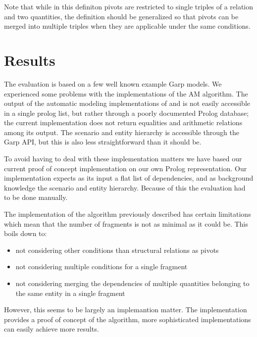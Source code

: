 \documentclass{article} %
\begin{document}
Note that while in this definiton pivots are restricted to single triples of a
relation and two quantities, the definition should be generalized so that
pivots can be merged into multiple triples when they are applicable under the
same conditions.

\section{Results}

The evaluation is based on a few well known example Garp models. 
We experienced some problems with the implementations of the AM algorithm.
The output of the automatic modeling implementations of \cite{buisman} and
\cite{vanweelden} is not easily accessible in a single prolog list, but rather
through a poorly documented Prolog database; the current implementation 
\cite{vanweelden} does not return equalities and arithmetic relations among
its output. The scenario and entity hierarchy is accessible through the Garp
API, but this is also less straightforward than it should be. 

To avoid having to deal with these implementation matters we have based our
current proof of concept implementation on our own Prolog representation. Our
implementation expects as its input a flat list of dependencies, and as
background knowledge the scenario and entity hierarchy. Because of this the
evaluation had to be done manually.

The implementation of the algorithm previously described has certain
limitations which mean that the number of fragments is not as minimal as it
could be. This boils down to:

\begin{itemize}

\item not considering other conditions than structural relations as pivots

\item not considering multiple conditions for a single fragment

\item not considering merging the dependencies of multiple quantities
	belonging to the same entity in a single fragment

\end{itemize}

However, this seems to be largely an implemantion matter. The implementation
provides a proof of concept of the algorithm, more sophisticated
implementations can easily achieve more results.
\end{document}
